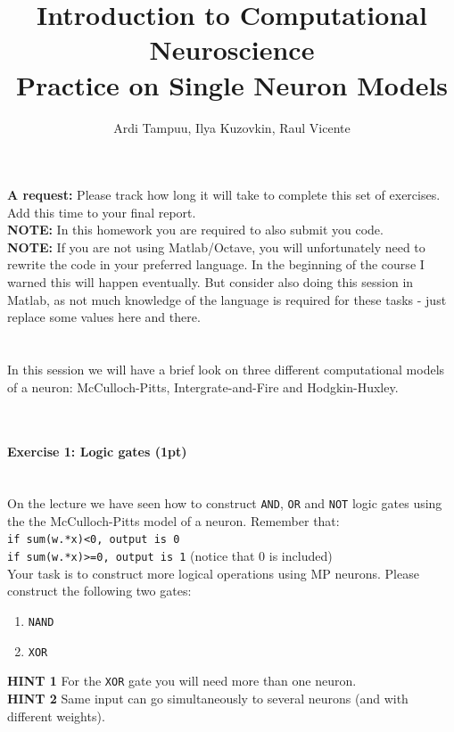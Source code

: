 \documentclass[a4paper,11pt]{article}
\author{\large{Ardi Tampuu, Ilya Kuzovkin, Raul Vicente}}
\title{\huge{Introduction to Computational Neuroscience}\\\LARGE{Practice on Single Neuron Models}}
\newenvironment{exercise}[3]{\paragraph{Exercise #1: #2 (#3pt)}\ \\}{
\medskip}
\begin{document}
\maketitle

\textbf{A request:} Please track how long it will take to complete this set of exercises. Add this time to your final report.
\ \\
\textbf{NOTE:} In this homework you are required to also submit you code.\\
\textbf{NOTE:} If you are not using Matlab/Octave, you will unfortunately need to rewrite the code in your preferred language. In the beginning of the course I warned this will happen eventually. But consider also doing this session in Matlab, as not much knowledge of the language is required for these tasks - just replace some values here and there.\\
\ \\
\ \\
%
%
In this session we will have a brief look on three different computational models of a neuron: McCulloch-Pitts, Intergrate-and-Fire and Hodgkin-Huxley.\

\ \\

%
%
\begin{exercise}{1}{Logic gates}{1}
On the lecture we have seen how to construct \texttt{AND}, \texttt{OR} and \texttt{NOT} logic gates using the the McCulloch-Pitts model of a neuron. Remember that:\\
 \texttt{if sum(w.*x)<0, output is 0}\\
 \texttt{if sum(w.*x)>=0, output is 1} (notice that 0 is included)\\
 Your task is to construct more logical operations using MP neurons. Please construct the following two gates:
\begin{enumerate}
\itemsep 0em
	\item \texttt{NAND}
	\item \texttt{XOR}
\end{enumerate}
\textbf{HINT 1} For the \texttt{XOR} gate you will need more than one neuron.\\
\textbf{HINT 2} Same input can go simultaneously to several neurons (and with different weights).
\end{exercise}
\end{document}
